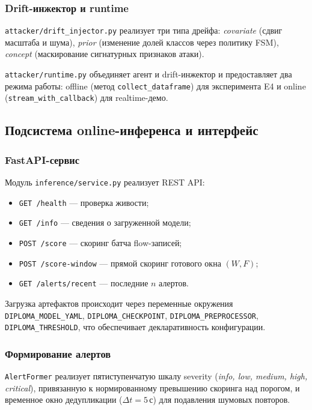 \subsubsection{Drift-инжектор и runtime}

\texttt{attacker/drift\_injector.py} реализует три типа дрейфа:
\emph{covariate} (сдвиг масштаба и шума), \emph{prior} (изменение
долей классов через политику FSM), \emph{concept} (маскирование
сигнатурных признаков атаки).

\texttt{attacker/runtime.py} объединяет агент и drift-инжектор и
предоставляет два режима работы: offline (метод
\texttt{collect\_dataframe}) для эксперимента E4 и online
(\texttt{stream\_with\_callback}) для realtime-демо.

\subsection{Подсистема online-инференса и интерфейс}

\subsubsection{FastAPI-сервис}

Модуль \texttt{inference/service.py} реализует REST API:

\begin{itemize}
    \item \texttt{GET /health} --- проверка живости;
    \item \texttt{GET /info} --- сведения о загруженной модели;
    \item \texttt{POST /score} --- скоринг батча flow-записей;
    \item \texttt{POST /score-window} --- прямой скоринг готового
    окна \((W, F)\);
    \item \texttt{GET /alerts/recent} --- последние \(n\) алертов.
\end{itemize}

Загрузка артефактов происходит через переменные окружения
\texttt{DIPLOMA\_MODEL\_YAML}, \texttt{DIPLOMA\_CHECKPOINT},
\texttt{DIPLOMA\_PREPROCESSOR}, \texttt{DIPLOMA\_THRESHOLD},
что обеспечивает декларативность конфигурации.

\subsubsection{Формирование алертов}

\texttt{AlertFormer} реализует пятиступенчатую шкалу severity
(\emph{info, low, medium, high, critical}), привязанную к
нормированному превышению скоринга над порогом, и временное окно
дедупликации (\(\Delta t = 5\,\text{с}\)) для подавления шумовых
повторов.

